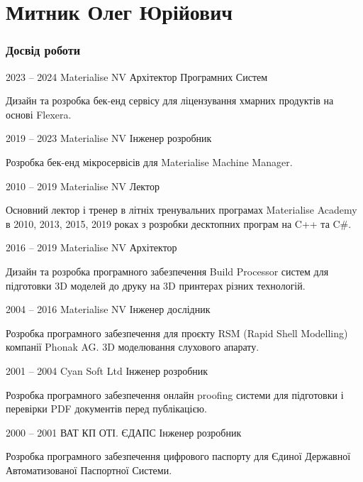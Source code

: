 \documentclass{tccv}
\begin{document}
\part
[Науковець, дослідник, досвічений розробник програмного забезпечення.]
{Митник Олег Юрійович}

\section{Досвід роботи}

\begin{eventlist}

\item{2023 -- 2024}
     {Materialise NV}
     {Архітектор Програмних Систем}

Дизайн та розробка бек-енд сервісу для ліцензування хмарних продуктів на основі Flexera.

\item{2019 -- 2023}
     {Materialise NV}
     {Інженер розробник}

Розробка бек-енд мікросервісів для Materialise Machine Manager.

\item{2010 -- 2019}
     {Materialise NV}
     {Лектор}

Основний лектор і тренер в літніх тренувальних програмах Materialise Academy в 2010, 2013, 2015, 2019 роках з розробки десктопних програм на C++ та C\#.

\item{2016 -- 2019}
     {Materialise NV}
     {Архітектор}

Дизайн та розробка програмного забезпечення Build Processor систем для підготовки 3D моделей до друку на 3D принтерах різних технологій.

\item{2004 -- 2016}
     {Materialise NV}
     {Інженер дослідник}

Розробка програмного забезпечення для проєкту RSM (Rapid Shell Modelling) компанії Phonak AG.
3D моделювання слухового апарату.

\item{2001 -- 2004}
     {Cyan Soft Ltd}
     {Інженер розробник}

Розробка програмного забезпечення онлайн proofing системи для підготовки і перевірки PDF документів перед публікацією.

\item{2000 -- 2001}
     {ВАТ КП ОТІ. ЄДАПС}
     {Інженер розробник}

Розробка програмного забезпечення цифрового паспорту для Єдиної Державної Автоматизованої Паспортної Системи.

\end{eventlist}
\end{document}
